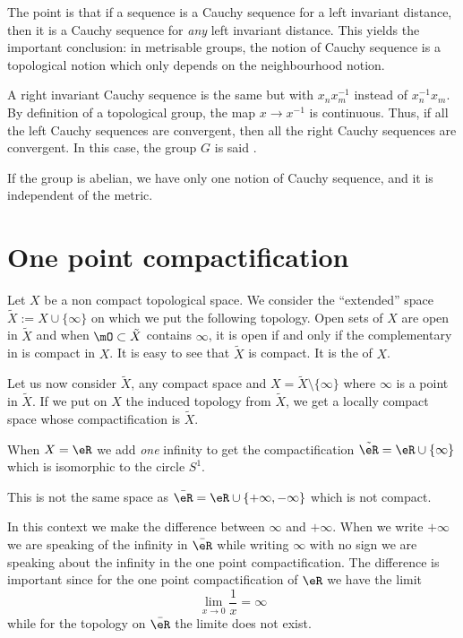 The point is that if a sequence is a Cauchy sequence for a left invariant distance, then it is a Cauchy sequence for \emph{any} left invariant distance. This yields the important conclusion: in metrisable groups, the notion of Cauchy sequence is a topological notion which only depends on the neighbourhood notion.

A right invariant Cauchy sequence is the same but with $x_nx_m^{-1}$ instead of $x_n^{-1} x_m$. By definition of a topological group, the map $x\to x^{-1}$ is continuous. Thus, if all the left Cauchy sequences are convergent, then all the right Cauchy sequences are convergent. In this case, the group $G$ is said .

If the group is abelian, we have only one notion of Cauchy sequence, and it is independent of the metric.

\section{One point compactification}  \label{sec:compactific}

\begin{definition}  \label{DEFooAKWJooWKcYav}
    Let $X$ be a non compact topological space. We consider the ``extended'' space $\tilde X:=X\cup\{ \infty\}$ on which we put the following topology. Open sets of $X$ are open in $\tilde X$ and when $\mO\subset\tilde X$ contains $\infty$, it is open if and only if the complementary in is compact in $X$. It is easy to see that $\tilde X$ is compact. It is the  of $X$.
\end{definition}

Let us now consider $\tilde X$, any compact space and $X=\tilde X\setminus\{\infty\}$ where $\infty$ is a point in $\tilde X$. If we put on $X$ the induced topology from $\tilde X$, we get a locally compact space whose compactification is $\tilde X$.

\begin{example}
    When \( X=\eR\) we add \emph{one} infinity to get the compactification \( \tilde \eR=\eR\cup\{ \infty \}\) which is isomorphic to the circle \( S^1\).

    This is not the same space as \( \bar \eR=\eR\cup\{ +\infty,-\infty \}\) which is not compact.
\end{example}

In this context we make the difference between \( \infty\) and \( +\infty\). When we write \( +\infty\) we are speaking of the infinity in \( \bar \eR\) while writing \( \infty\) with no sign we are speaking about the infinity in the one point compactification. The difference is important since for the one point compactification of \( \eR\) we have the limit
\begin{equation}
    \lim_{x\to 0} \frac{1}{ x }=\infty
\end{equation}
while for the topology on \( \bar \eR\) the limite does not exist.

